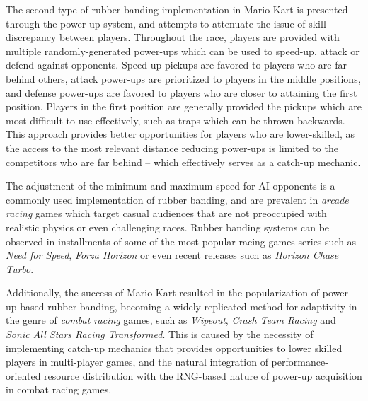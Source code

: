 The second type of rubber banding implementation in Mario Kart is presented through the power-up system, and attempts to attenuate the issue of skill discrepancy between players. Throughout the race, players are provided with multiple randomly-generated power-ups which can be used to speed-up, attack or defend against opponents. Speed-up pickups are favored to players who are far behind others, attack power-ups are prioritized to players in the middle positions, and defense power-ups are favored to players who are closer to attaining the first position. Players in the first position are generally provided the pickups which are most difficult to use effectively, such as traps which can be thrown backwards. This approach provides better opportunities for players who are lower-skilled, as the access to the most relevant distance reducing power-ups is limited to the competitors who are far behind -- which effectively serves as a catch-up mechanic.


The adjustment of the minimum and maximum speed for AI opponents is a commonly used implementation of rubber banding, and are prevalent in \emph{arcade racing} games which target casual audiences that are not preoccupied with realistic physics or even challenging races. Rubber banding systems can be observed in installments of some of the most popular racing games series such as \emph{Need for Speed}, \emph{Forza Horizon} or even recent releases such as \emph{Horizon Chase Turbo}.

Additionally, the success of Mario Kart resulted in the popularization of power-up based rubber banding, becoming a widely replicated method for adaptivity in the genre of \emph{combat racing} games, such as \emph{Wipeout}, \emph{Crash Team Racing} and \emph{Sonic All Stars Racing Transformed}. This is caused by the necessity of implementing catch-up mechanics that provides opportunities to lower skilled players in multi-player games, and the natural integration of performance-oriented resource distribution with the RNG-based nature of power-up acquisition in combat racing games.  

